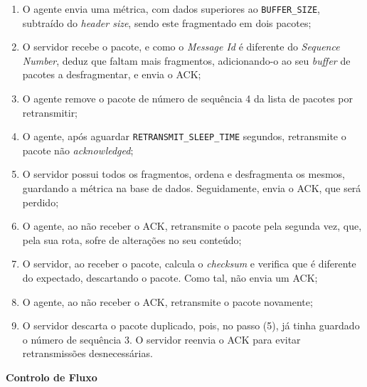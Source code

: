 \documentclass[a4paper,12pt]{scrreprt}
\begin{document}
\begin{enumerate}
    \item O agente envia uma métrica, com dados superiores ao \texttt{BUFFER\_SIZE}, subtraído do \textit{header size},
    sendo este fragmentado em dois pacotes;
    \item O servidor recebe o pacote, e como o \textit{Message Id} é diferente do \textit{Sequence Number}, deduz que
    faltam mais fragmentos, adicionando-o ao seu \textit{buffer} de pacotes a desfragmentar, e envia o ACK;
    \item O agente remove o pacote de número de sequência 4 da lista de pacotes por retransmitir;
    \item O agente, após aguardar \texttt{RETRANSMIT\_SLEEP\_TIME} segundos, retransmite o pacote não \textit{acknowledged};
    \item O servidor possui todos os fragmentos, ordena e desfragmenta os mesmos, guardando a métrica na base de dados.
    Seguidamente, envia o ACK, que será perdido;
    \item O agente, ao não receber o ACK, retransmite o pacote pela segunda vez, que, pela sua rota, sofre de alterações
    no seu conteúdo;
    \item O servidor, ao receber o pacote, calcula o \textit{checksum} e verifica que é diferente do expectado, descartando
    o pacote. Como tal, não envia um ACK;
    \item O agente, ao não receber o ACK, retransmite o pacote novamente;
    \item O servidor descarta o pacote duplicado, pois, no passo (5), já tinha guardado o número de sequência 3.
    O servidor reenvia o ACK para evitar retransmissões desnecessárias.
\end{enumerate}


\textbf{Controlo de Fluxo}
\end{document}
